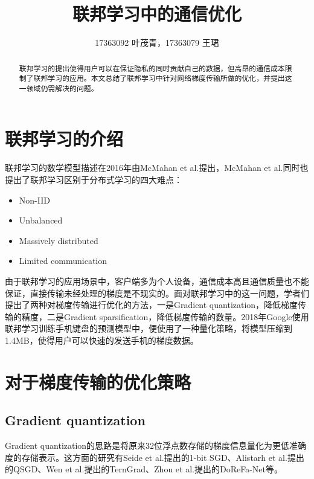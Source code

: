\documentclass[12pt,onecolumn,letterpaper]{article}
\begin{document}
    \title{联邦学习中的通信优化}
    \author{17363092 叶茂青，17363079 王珺}

    \maketitle
    \begin{abstract}
        联邦学习的提出使得用户可以在保证隐私的同时贡献自己的数据，但高昂的通信成本限制了联邦学习的应用。本文总结了联邦学习中针对网络梯度传输所做的优化，并提出这一领域仍需解决的问题。
    \end{abstract}

    \section{联邦学习的介绍}
    联邦学习的数学模型描述在2016年由McMahan et al.\cite{McMahan2016}提出，McMahan et al.同时也提出了联邦学习区别于分布式学习的四大难点：
    
    \begin{itemize}
        \item Non-IID
        \item Unbalanced
        \item Massively distributed
        \item Limited communication
    \end{itemize}
    
    由于联邦学习的应用场景中，客户端多为个人设备，通信成本高且通信质量也不能保证，直接传输未经处理的梯度是不现实的。面对联邦学习中的这一问题，学者们提出了两种对梯度传输进行优化的方法，一是Gradient quantization，降低梯度传输的精度，二是Gradient sparsification，降低梯度传输的数量。2018年Google\cite{Hard2018}使用联邦学习训练手机键盘的预测模型中，便使用了一种量化策略，将模型压缩到1.4MB，使得用户可以快速的发送手机的梯度数据。


    \section{对于梯度传输的优化策略}

    \subsection{Gradient quantization}
    Gradient quantization的思路是将原来32位浮点数存储的梯度信息量化为更低准确度的存储表示。这方面的研究有Seide et al.\cite{Seide2014}提出的1-bit SGD、Alistarh et al.\cite{Alistarh}提出的QSGD、Wen et al.\cite{Wen}提出的TernGrad、Zhou et al.\cite{Zhou}提出的DoReFa-Net等。
    
\end{document}
